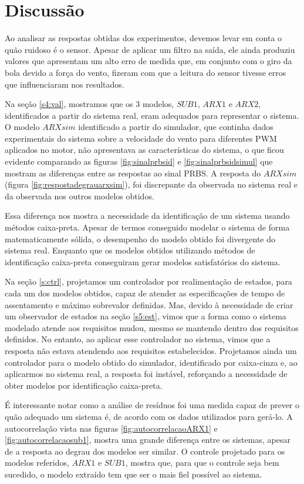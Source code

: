 \section{Discussão}

Ao analisar as respostas obtidas dos experimentos, devemos levar em conta o quão ruidoso é o sensor. Apesar de aplicar um filtro na saída, ele ainda produziu valores que apresentam um alto erro de medida que, em conjunto com o giro da bola devido a força do vento, fizeram com que a leitura do sensor tivesse erros que influenciaram nos resultados.


Na seção \ref{s4:val}, mostramos que os 3 modelos, $SUB1$, $ARX1$ e $ARX2$, identificados a partir do sistema real, eram adequados para representar o sistema. O modelo $ARXsim$ identificado a partir do simulador, que continha dados experimentais do sistema sobre a velocidade do vento para diferentes PWM aplicados no motor, não apresentava as características do sistema, o que ficou evidente comparando as figuras \ref{fig:sinalprbsid} e \ref{fig:sinalprbsidsimul} que mostram as diferenças entre as respostas ao sinal PRBS. A resposta do $ARXsim$ (figura \ref{fig:respostadegrauarxsim}), foi discrepante da observada no sistema real e da observada nos outros modelos obtidos.


Essa diferença nos mostra a necessidade da identificação de um sistema usando métodos caixa-preta. Apesar de termos conseguido modelar o sistema de forma matematicamente sólida, o desempenho do modelo obtido foi divergente do sistema real. Enquanto que os modelos obtidos utilizando métodos de identificação caixa-preta conseguiram gerar modelos satisfatórios do sistema. 


Na seção \ref{s:ctrl}, projetamos um controlador por realimentação de estados, para cada um dos modelos obtidos, capaz de atender as especificações de tempo de assentamento e máximo sobrevalor definidas. Mas, devido à necessidade de criar um observador de estados na seção \ref{s5:est}, vimos que a forma como o sistema modelado atende aos requisitos mudou, mesmo se mantendo dentro dos requisitos definidos. No entanto, ao aplicar esse controlador no sistema, vimos que a resposta não estava atendendo aos requisitos estabelecidos. Projetamos ainda um controlador para o modelo obtido do simulador, identificado por caixa-cinza e, ao aplicarmos no sistema real, a resposta foi instável, reforçando a necessidade de obter modelos por identificação caixa-preta.


É interessante notar como a análise de resíduos foi uma medida capaz de prever o quão adequado um sistema é, de acordo com os dados utilizados para gerá-lo. A autocorrelação vista nas figuras \ref{fig:autocorrelacaoARX1} e \ref{fig:autocorrelacaosub1}, mostra uma grande diferença entre os sistemas, apesar de a resposta ao degrau dos modelos ser similar. O controle projetado para os modelos referidos, $ARX1$ e $SUB1$, mostra que, para que o controle seja bem sucedido, o modelo extraído tem que ser o mais fiel possível ao sistema.








